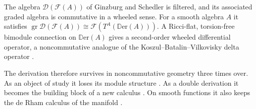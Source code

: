 \begin{remark}
\label{rem:cohomology:ncg-fock}
The algebra $\mathcal{D}(\mathcal{F}(A))$ of Ginzburg and Schedler is
filtered, and its associated graded algebra is commutative in a wheeled
sense. For a smooth algebra $A$ it satisfies
$\operatorname{gr}\mathcal{D}(\mathcal{F}(A))\cong
\mathcal{F}(T^{A}(\mathbb{D}\mathrm{er}(A)))$. A Ricci-flat, torsion-free
bimodule connection on $\mathbb{D}\mathrm{er}(A)$ gives a second-order
wheeled differential operator, a noncommutative analogue of the
Koszul--Batalin--Vilkovisky delta operator
\cite[Abstract, p.~673]{GinzburgSchedler2010BV}.
\end{remark}

The derivation therefore survives in noncommutative geometry three times over.
As an object of study it loses its module structure \cite[Abstract,
p.~1]{Sardanashvily2007Dilemma}. As a double derivation it becomes the
building block of a new calculus \cite[Abstract,
p.~673]{GinzburgSchedler2010BV}. On smooth functions it also keeps the de Rham
calculus of the manifold \cite[p.~1]{Sardanashvily2007Dilemma}.
